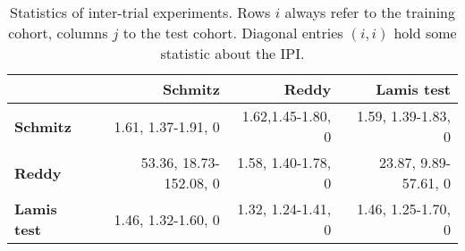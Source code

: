 \begin{table}
    \vspace{0.5cm}
    \begin{subtable}{\textwidth}
        \centering
        \begin{tabular}{lrrr}
            \hline
            & \textbf{Schmitz} & \textbf{Reddy} & \textbf{Lamis test} \\
            \hline
            \textbf{Schmitz} & \num{1.61}, \num{1.37}-\num{1.91}, \num{0} & 
                \num{1.62},\num{1.45}-\num{1.80}, \num{0} & 
                \num{1.59}, \num{1.39}-\num{1.83}, 0 \\
            \textbf{Reddy} & \num{53.36}, \num{18.73}-\num{152.08}, 0 & 
                \num{1.58}, \num{1.40}-\num{1.78}, \num{0} & 
                \num{23.87}, \num{9.89}-\num{57.61}, 0 \\
            \textbf{Lamis test} & \num{1.46}, \num{1.32}-\num{1.60}, 0 & 
                \num{1.32}, \num{1.24}-\num{1.41}, \num{0} & 
                \num{1.46}, \num{1.25}-\num{1.70}, \num{0} \\
            \hline
        \end{tabular}
        \caption{Hazard ratio, its \num{95}\%-confidence interval and p-value for the null 
            hypothesis of the hazard ratio being equal to one. Diagonal entries show these 
            properties for the $\text{tIPI}$, off-diagonal entries for the best model trained and 
            validated on cohort $i$, $m_i^*$. All p-values are below 
            \num[scientific-notation]{5e-6}.}
            \label{subtab:inter-hr}
    \end{subtable}
    \caption{Statistics of inter-trial experiments. Rows $i$ always refer to the training cohort, 
        columns $j$ to the test cohort. Diagonal entries $(i, i)$ hold some statistic about the 
        IPI.}
    \label{table:inter-trial}
\end{table}
